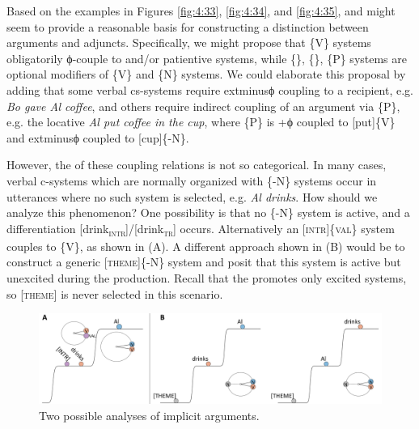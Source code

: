  Based on the examples in Figures {\ref{fig:4:33}}, {\ref{fig:4:34}}, and {\ref{fig:4:35}},  and  might seem to provide a reasonable basis for constructing a distinction between arguments and adjuncts. Specifically, we might propose that \{V\} systems obligatorily ϕ-couple to  and/or patientive systems, while \{\}, \{\}, \{P\} systems are optional modifiers of \{V\} and \{N\} systems. We could elaborate this proposal by adding that some verbal cs-systems require 	extminus{}ϕ coupling to a recipient, e.g. \textit{Bo gave Al coffee}, and others require indirect coupling of an argument via \{P\}, e.g. the locative \textit{Al put coffee in the cup}, where \{P\} is +ϕ coupled to [put]\{V\} and 	extminus{}ϕ coupled to [cup]\{-N\}.

  However, the  of these coupling relations is not so categorical. In many cases, verbal c-systems which are normally organized with \{-N\} systems occur in utterances where no such system is selected, e.g. \textit{Al drinks}. How should we analyze this phenomenon? One possibility is that no \{-N\} system is active, and a differentiation [drink\textsc{\textsubscript{intr}}]/[drink\textsc{\textsubscript{tr}}] occurs. Alternatively an [\textsc{intr}]\{\textsc{val}\} system couples to \{V\}, as shown in {}(A). A different approach shown in (B) would be to construct a generic [\textsc{theme}]\{-N\} system and posit that this system is active but unexcited during the production. Recall that the  promotes only excited systems, so [\textsc{theme}] is never selected in this scenario. 

  
\begin{figure}
\includegraphics[width=\textwidth]{figures/Tilsen-img86.png}
\caption{Two possible analyses of implicit arguments.}
\label{fig:4:36}
\end{figure}
 

